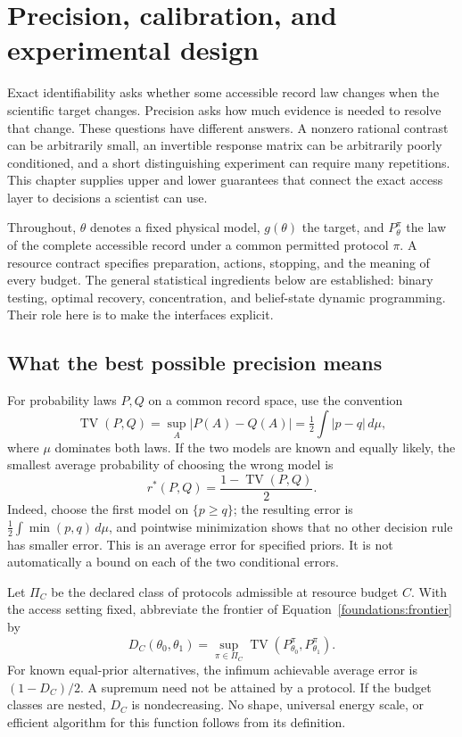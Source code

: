 \chapter{Precision, calibration, and experimental design}
\label{precision:chapter}

Exact identifiability asks whether some accessible record law changes when the
scientific target changes. Precision asks how much evidence is needed to resolve
that change. These questions have different answers. A nonzero rational contrast
can be arbitrarily small, an invertible response matrix can be arbitrarily poorly
conditioned, and a short distinguishing experiment can require many repetitions.
This chapter supplies upper and lower guarantees that connect the exact access
layer to decisions a scientist can use.

Throughout, $\theta$ denotes a fixed physical model, $g(\theta)$ the target, and
$P_\theta^\pi$ the law of the complete accessible record under a common permitted
protocol $\pi$. A resource contract specifies preparation, actions, stopping,
and the meaning of every budget. The general statistical ingredients below are
established: binary testing, optimal recovery, concentration, and belief-state
dynamic programming. Their role here is to make the interfaces explicit.

\section{What the best possible precision means}

For probability laws $P,Q$ on a common record space, use the convention
\[
 \operatorname{TV}(P,Q)=\sup_A|P(A)-Q(A)|
 =\tfrac12\int|p-q|\,d\mu,
\]
where $\mu$ dominates both laws. If the two models are known and equally likely,
the smallest average probability of choosing the wrong model is
\begin{equation}
 r^*(P,Q)=\frac{1-\operatorname{TV}(P,Q)}2.
 \label{precision:tv-risk}
\end{equation}
Indeed, choose the first model on $\{p\geq q\}$; the resulting error is
$\frac12\int\min(p,q)\,d\mu$, and pointwise minimization shows that no other
decision rule has smaller error. This is an average error for specified priors.
It is not automatically a bound on each of the two conditional errors.

Let $\Pi_C$ be the declared class of protocols admissible at resource budget $C$.
With the access setting fixed, abbreviate the frontier of
Equation~\eqref{foundations:frontier} by
\begin{equation}
 D_C(\theta_0,\theta_1)=
 \sup_{\pi\in\Pi_C}\operatorname{TV}(P_{\theta_0}^\pi,P_{\theta_1}^\pi).
 \label{precision:resource-discrimination}
\end{equation}
For known equal-prior alternatives, the infimum achievable average error is
$(1-D_C)/2$. A supremum need not be attained by a protocol. If the budget classes
are nested, $D_C$ is nondecreasing. No shape, universal energy scale, or efficient
algorithm for this function follows from its definition.


